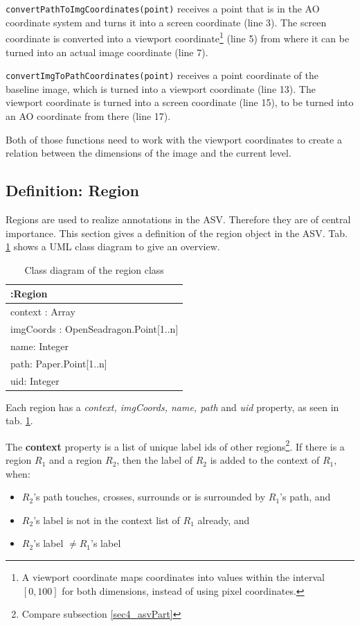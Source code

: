 \texttt{convertPathToImgCoordinates(point)} receives a point that is in the AO coordinate system and turns it into a screen coordinate (line 3). The screen coordinate is converted into a viewport coordinate\footnote{
	A viewport coordinate maps coordinates into values within the interval $[0, 100]$ for both dimensions, instead of using pixel coordinates\cite{web:openseadragon}.
} (line 5) from where it can be turned into an actual image coordinate (line 7).

\texttt{convertImgToPathCoordinates(point)} receives a point coordinate of the baseline image, which is turned into a viewport coordinate (line 13). The viewport coordinate is turned into a screen coordinate (line 15), to be turned into an AO coordinate from there (line 17).

Both of those functions need to work with the viewport coordinates to create a relation between the dimensions of the image and the current level.

\subsection{Definition: Region}
Regions are used to realize annotations in the ASV. Therefore they are of central importance. This section gives a definition of the region object in the ASV. Tab. \ref{tab4_regionUML} shows a UML class diagram to give an overview.

\begin{table}[H]
	\begin{center}
		\begin{tabular}{| p{7cm} |}
			\hline
			\textbf{:Region} \\ \hline
			context : Array\\
			imgCoords : OpenSeadragon.Point[1..n]\\
			name: Integer\\
			path: Paper.Point[1..n]\\
			uid: Integer\\ \hline
		\end{tabular}
		\caption{Class diagram of the region class}
		\label{tab4_regionUML}
	\end{center}
\end{table}

Each region has a \emph{context, imgCoords, name, path} and \emph{uid} property, as seen in tab. \ref{tab4_regionUML}.

The \textbf{context} property is a list of unique label ids of other regions\footnote{
	Compare subsection \ref{sec4_asvPart}
}. If there is a region $R_1$ and a region $R_2$, then the label of $R_2$ is added to the context of $R_1$, when:
\begin{itemize}
	\item $R_2$'s path touches, crosses, surrounds or is surrounded by $R_1$'s path, and
	\item $R_2$'s label is not in the context list of $R_1$ already, and
	\item $R_2$'s label $\neq R_1$'s label
\end{itemize}

